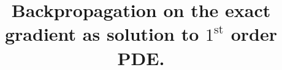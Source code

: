 
\title{Backpropagation on the exact gradient as solution to $1^{\text{st}}$ order PDE.}

    \maketitle
    
    
    

